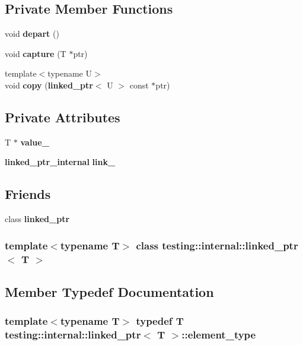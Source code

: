 \subsection*{Private Member Functions}
\begin{CompactItemize}
\item 
void {\bf depart} ()
\item 
void {\bf capture} (T $\ast$ptr)
\item 
{\footnotesize template$<$typename U$>$ }\\void {\bf copy} ({\bf linked\_\-ptr}$<$ U $>$ const $\ast$ptr)
\end{CompactItemize}
\subsection*{Private Attributes}
\begin{CompactItemize}
\item 
T $\ast$ {\bf value\_\-}
\item 
{\bf linked\_\-ptr\_\-internal} {\bf link\_\-}
\end{CompactItemize}
\subsection*{Friends}
\begin{CompactItemize}
\item 
class {\bf linked\_\-ptr}
\end{CompactItemize}
\subsubsection*{template$<$typename T$>$ class testing::internal::linked\_\-ptr$<$ T $>$}



\subsection{Member Typedef Documentation}
\subsubsection{\setlength{\rightskip}{0pt plus 5cm}template$<$typename T$>$ typedef T {\bf testing::internal::linked\_\-ptr}$<$ T $>$::{\bf element\_\-type}}\label{classtesting_1_1internal_1_1linked__ptr_312c4b57c4c2df9342554d614279d37c}




